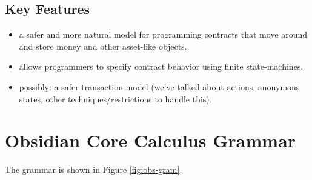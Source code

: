 \documentclass[runningheads,a4paper]{llncs}
\begin{document}
\subsection{Key Features}

\begin{itemize}
\item a safer and more natural model for programming contracts that move around and store money and other asset-like objects.
\item allows programmers to specify contract behavior using finite state-machines.
\item possibly: a safer transaction model (we've talked about actions, anonymous states, other techniques/restrictions to handle this).
\end{itemize}

\fi

\section{Obsidian Core Calculus Grammar}

The grammar is shown in Figure \ref{fig:obs-gram}.\\

\newcommand{\stateS}{\texttt{state}}
\newcommand{\ownedS}{\texttt{owned}}
\newcommand{\readonlyS}{\texttt{readonly}}
\newcommand{\sharedS}{\texttt{shared}}
\newcommand{\contractS}{\texttt{contract}}
\newcommand{\extcontractS}{\texttt{external\ contract}}
\newcommand{\letS}{\texttt{let}}
\newcommand{\throwS}{\texttt{throw}}
\newcommand{\tryS}{\texttt{try}}
\newcommand{\catchS}{\texttt{catch}}
\newcommand{\thisS}{\texttt{this}}
\newcommand{\inS}{\texttt{in}}
\newcommand{\caseS}{\texttt{case}}
\newcommand{\switchS}{\texttt{switch}}
\newcommand{\newS}{\texttt{new}}
\newcommand{\permS}{\triangleright}
\newcommand{\functionS}{\texttt{function}}
\newcommand{\transactionS}{\texttt{transaction}}
\newcommand{\voidS}{\textsf{void}}
\newcommand{\unpackS}{\texttt{unpack}}
\newcommand{\packS}{\texttt{pack_to}}
\newcommand{\withS}{\texttt{returns}}
\newcommand{\asS}{\texttt{as}}
\newcommand{\ofS}{\texttt{managed_by}}
\newcommand{\trueS}{\textsf{t}}
\newcommand{\falseS}{\textsf{f}}
\end{document}
